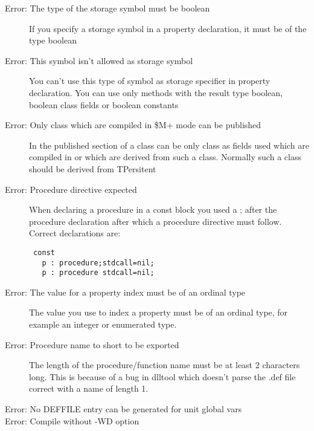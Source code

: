 \begin{description}
\item [Error: The type of the storage symbol must be boolean]
 If you specify a storage symbol in a property declaration, it must be of
 the type boolean
\item [Error: This symbol isn't allowed as storage symbol]
 You can't use this type of symbol as storage specifier in property
 declaration. You can use only methods with the result type boolean,
 boolean class fields or boolean constants
\item [Error: Only class which are compiled in \$M+ mode can be published]
 In the published section of a class can be only class as fields used which
 are compiled in  or which are derived from such a class. Normally
 such a class should be derived from TPersitent
\item [Error: Procedure directive expected]
 When declaring a procedure in a const block you used a ; after the
 procedure declaration after which a procedure directive must follow.
 Correct declarations are:
 \begin{verbatim}
 const
   p : procedure;stdcall=nil;
   p : procedure stdcall=nil;
 \end{verbatim}
\item [Error: The value for a property index must be of an ordinal type]
 The value you use to index a property must be of an ordinal type, for
 example an integer or enumerated type.
\item [Error: Procedure name to short to be exported]
 The length of the procedure/function name must be at least 2 characters
 long. This is because of a bug in dlltool which doesn't parse the .def
 file correct with a name of length 1.
\item [Error: No DEFFILE entry can be generated for unit global vars]
\item [Error: Compile without -WD option]
 \end{description}
